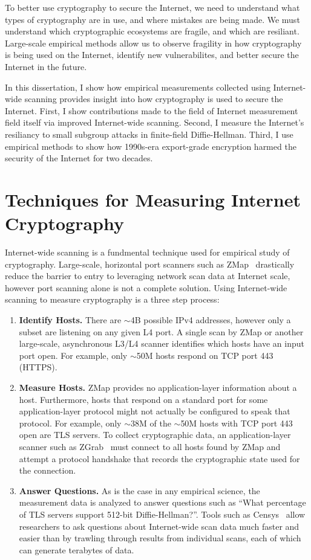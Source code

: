 To better use cryptography to secure the Internet, we need to understand what
types of cryptography are in use, and where mistakes are being made. We must
understand which cryptographic ecosystems are fragile, and which are
resiliant. Large-scale empirical methods allow us to observe fragility in how
cryptography is being used on the Internet, identify new vulnerabilites, and
better secure the Internet in the future.

In this dissertation, I show how empirical measurements collected using
Internet-wide scanning provides insight into how cryptography is used to
secure the Internet. First, I show contributions made to the field of
Internet measurement field itself via improved Internet-wide scanning.
Second, I measure the Internet's resiliancy to small subgroup attacks in
finite-field Diffie-Hellman. Third, I use empirical methods to show how
1990s-era export-grade encryption harmed the security of the Internet for two
decades.

\section{Techniques for Measuring Internet Cryptography}

Internet-wide scanning is a fundmental technique used for empirical study of
cryptography. Large-scale, horizontal port scanners such as
ZMap~\cite{zmap-2013} drastically reduce the barrier to entry to leveraging
network scan data at Internet scale, however port scanning alone is not a
complete solution. Using Internet-wide scanning to measure cryptography is a
three step process:
\begin{enumerate}
  \item \textbf{Identify Hosts.}
    There are $\sim$4B possible IPv4 addresses, however only a subset are
    listening on any given L4 port. A single scan by ZMap or another
    large-scale, asynchronous L3/L4 scanner identifies which hosts have an
    input port open. For example, only $\sim$50M hosts respond on TCP port 443
    (HTTPS).
  \item \textbf{Measure Hosts.}
    ZMap provides no application-layer information about a host. Furthermore,
    hosts that respond on a standard port for some application-layer protocol
    might not actually be configured to speak that protocol. For example,
    only $\sim$38M of the $\sim$50M hosts with TCP port 443 open are TLS
    servers. To collect cryptographic data, an application-layer scanner such
    as ZGrab~\cite{zgrab-github} must connect to all hosts found by ZMap and
    attempt a protocol handshake that records the cryptographic state used
    for the connection.
  \item \textbf{Answer Questions.}
    As is the case in any empirical science, the measurement data is analyzed
    to answer questions such as ``What percentage of TLS servers support
    512-bit Diffie-Hellman?''. Tools such as Censys~\cite{censys} allow
    researchers to ask questions about Internet-wide scan data much faster
    and easier than by trawling through results from individual scans, each
    of which can generate terabytes of data.
\end{enumerate}


